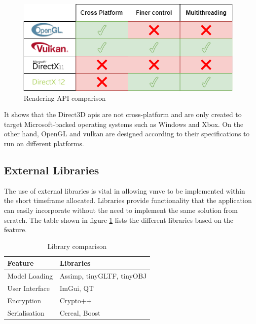 \documentclass[11pt]{article}
\begin{document}
\begin{figure}[H]
  \centering
  \includegraphics[width=\textwidth]{images/api_comparison.png}
  \caption{Rendering API comparison}
  \label{fig:api_comparison}
\end{figure}

It shows that the Direct3D \glspl*{api} are not cross-platform and are only
created to target Microsoft-backed operating systems such as Windows and Xbox.
On the other hand, OpenGL and \gls*{vulkan} are designed according to their
specifications to run on different platforms.

\subsection{External Libraries}
The use of external libraries is vital in allowing \gls*{vmve} to be implemented
within the short timeframe allocated. Libraries provide functionality that the
application can easily incorporate without the need to implement the same
solution from scratch. The table shown in figure \ref{tab:library_compare} lists
the different libraries based on the feature.

\begin{table}[H]
  \centering
  \footnotesize
  \setlength{\tabcolsep}{4pt}
  \begin{tabular}{>{\centering\arraybackslash}m{2.5cm} >{\centering\arraybackslash}m{3.5cm}}
  \toprule
  \rowcolor{gray!50}
  \textbf{Feature} & \textbf{Libraries} \\ \midrule
  Model Loading      &  Assimp, tinyGLTF, tinyOBJ \\ \addlinespace
  User Interface    & ImGui, QT \\ \addlinespace
  Encryption    & Crypto++ \\ \addlinespace
  Serialisation   & Cereal, Boost \\ \bottomrule
  \end{tabular}
  \caption{Library comparison}
  \label{tab:library_compare}
\end{table}
\end{document}
